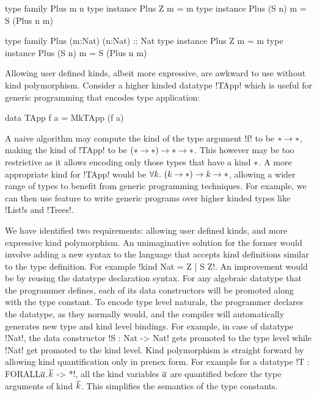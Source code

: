 \documentclass[screen,nonacm]{acmart}
\begin{document}
\begin{minipage}[ht]{0.4\linewidth}
\begin{code}
     type family Plus m n
     type instance Plus Z m = m
     type instance Plus (S n) m = S (Plus n m)
\end{code}
\end{minipage}
\begin{minipage}[ht]{0.4\linewidth}
\begin{code}
     type family Plus (m:Nat) (n:Nat) :: Nat
     type instance Plus Z m = m
     type instance Plus (S n) m = S (Plus n m)
\end{code}
\end{minipage}

Allowing user defined kinds, albeit more expressive, are awkward to use without kind polymorphism. Consider a higher kinded datatype !TApp! which is useful for generic programming that encodes type application:

\begin{CenteredBox}
\begin{code}
data TApp f a = MkTApp (f a)
\end{code}
\end{CenteredBox}

A naive algorithm may compute the kind of the type argument !f! to be $\ast \to \ast$, making the kind of !TApp! to be $(\ast \to \ast) \to \ast \to \ast$. This however may be too restrictive as it allows encoding only those types that have a kind $\ast$. A more appropriate kind for !TApp! would be $\forall k.~(k\to\ast) \to k \to \ast$, allowing a wider range of types to benefit from generic programming techniques. For example, we can then use feature to write generic programs over higher kinded types like !List!s and !Trees!\cite{magalhaes_generic_2010}.

We have identified two requirements: allowing user defined kinds, and
more expressive kind polymorphism. An unimaginative solution for the former would involve adding a new syntax to the language that accepts kind definitions similar to the type definition. For example !kind Nat = Z | S Z!. An improvement would be by reusing the datatype declaration syntax. For any algebraic datatype that the programmer defines, each of its data constructors will be promoted along with the type constant. To encode type level naturals, the programmer declares the datatype, as they normally would, and the compiler will automatically generates new type and kind level bindings. For example, in case of datatype !Nat!, the data constructor !S : Nat -> Nat! gets promoted to the type level while !Nat! get promoted to the kind level. Kind polymorphism is straight forward by allowing kind quantification only in prenex form. For example for a datatype !T : FORALL$\overline{a}$.$\overline{k}$ -> *!, all the kind variables $\overline{a}$ are quantified before the type arguments of kind $\overline{k}$. This simplifies the semantics of the type constants.
\end{document}
